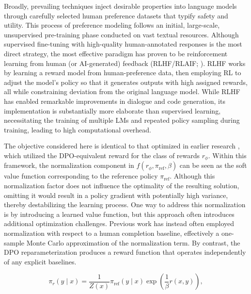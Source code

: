 Broadly, prevailing techniques inject desirable properties into language models through carefully selected human preference datasets that typify safety and utility. This process of preference modeling follows an initial, large-scale, unsupervised pre-training phase conducted on vast textual resources. Although supervised fine-tuning with high-quality human-annotated responses is the most direct strategy, the most effective paradigm has proven to be reinforcement learning from human (or AI-generated) feedback (RLHF/RLAIF; \citep{christiano2017deep,bai2022constitutional}). RLHF works by learning a reward model from human-preference data, then employing RL to adjust the model’s policy so that it generates outputs with high assigned rewards, all while constraining deviation from the original language model. While RLHF has enabled remarkable improvements in dialogue and code generation, its implementation is substantially more elaborate than supervised learning, necessitating the training of multiple LMs and repeated policy sampling during training, leading to high computational overhead.

The objective considered here is identical to that optimized in earlier research 
\citep{ziegler2020finetuning, stiennon2022learning, bai2022training, ouyang2022training}, which utilized the DPO-equivalent reward for the class of rewards $r_{\phi}$. Within this framework, the normalization component in $f(r_{\phi}, \pi_\text{ref}, \beta)$ can be seen as the soft value function corresponding to the reference policy $\pi_\text{ref}$. Although this normalization factor does not influence the optimality of the resulting solution, omitting it would result in a policy gradient with potentially high variance, thereby destabilizing the learning process. One way to address this normalization is by introducing a learned value function, but this approach often introduces additional optimization challenges. Previous work has instead often employed normalization with respect to a human completion baseline, effectively a one-sample Monte Carlo approximation of the normalization term. By contrast, the DPO reparameterization produces a reward function that operates independently of any explicit baselines. 

\begin{equation}\label{eq:op_policy}
    \pi_r(y\mid x) = \frac{1}{Z(x)}\pi_\text{ref}(y\mid x)\exp\left(\frac{1}{\beta}r(x, y)\right),
\end{equation}


